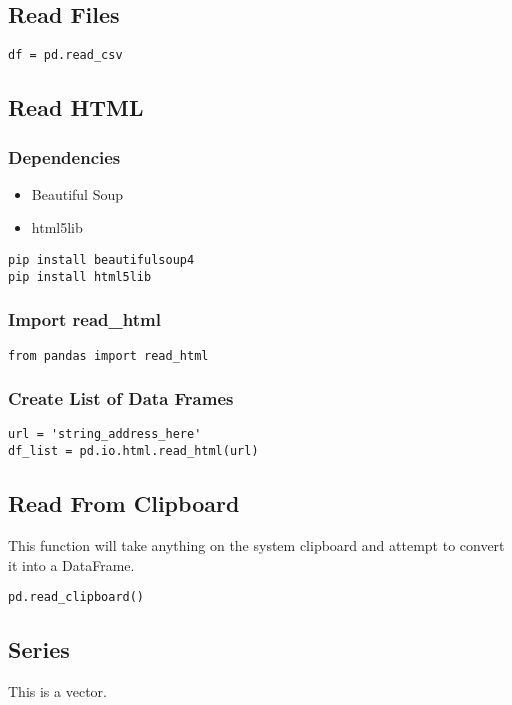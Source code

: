 \subsection{Read Files}
\begin{lstlisting}
df = pd.read_csv
\end{lstlisting}

\subsection{Read HTML}

%
\subsubsection{Dependencies}
\begin{itemize}

  \item Beautiful Soup

  \item html5lib
\end{itemize}
\begin{lstlisting}
pip install beautifulsoup4
pip install html5lib
\end{lstlisting}

%
\subsubsection{Import read\_html}
\begin{lstlisting}
from pandas import read_html
\end{lstlisting}

%
\subsubsection{Create List of Data Frames}
\begin{lstlisting}
url = 'string_address_here'
df_list = pd.io.html.read_html(url)
\end{lstlisting}

\subsection{Read From Clipboard}
This function will take anything on the system clipboard and attempt to convert
it into a DataFrame.
\begin{lstlisting}
pd.read_clipboard()
\end{lstlisting}

\subsection{Series}
This is a vector.

